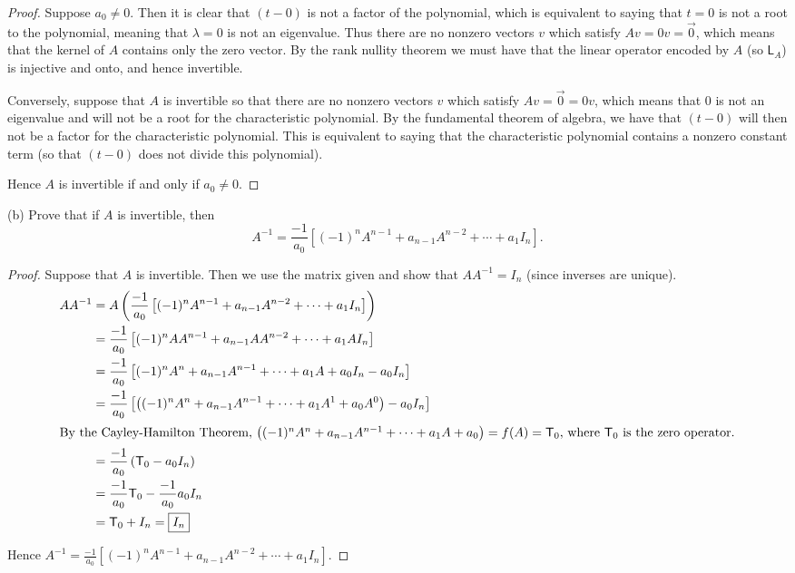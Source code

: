 \documentclass[11pt]{article}
\newcommand{\br}[1]{\left(#1\right)}
\newcommand{\sbr}[1]{\left[#1\right]}
\begin{document}
\begin{proof}
  Suppose $a_0\neq 0$. Then it is clear that $(t-0)$ is not a factor of the polynomial, which is equivalent to saying that $t=0$ is not a root to the polynomial, meaning that $\lambda=0$ is not an eigenvalue. Thus there are no nonzero vectors $v$ which satisfy $Av = 0v = \vec{0}$, which means that the kernel of $A$ contains only the zero vector. By the rank nullity theorem we must have that the linear operator encoded by $A$ (so $\mathsf{L}_A$) is injective and onto, and hence invertible.

  Conversely, suppose that $A$ is invertible so that there are no nonzero vectors $v$ which satisfy $Av = \vec{0} = 0v$, which means that $0$ is not an eigenvalue and will not be a root for the characteristic polynomial. By the fundamental theorem of algebra, we have that $(t-0)$ will then not be a factor for the characteristic polynomial. This is equivalent to saying that the characteristic polynomial contains a nonzero constant term (so that $(t-0)$ does not divide this polynomial).

  Hence $A$ is invertible if and only if $a_0\neq 0$.
\end{proof}

(b) Prove that if $A$ is invertible, then $$A^{-1} = \frac{-1}{a_0}\sbr{(-1)^nA^{n-1}+a_{n-1}A^{n-2}+\cdots +a_1I_n}.$$

\begin{proof}
  Suppose that $A$ is invertible. Then we use the matrix given and show that $AA^{-1} = I_n$ (since inverses are unique). 
  \begin{align*}
    AA^{-1} &= A\br{\frac{-1}{a_0}\sbr{(-1)^nA^{n-1}+a_{n-1}A^{n-2}+\cdots +a_1I_n}} \\
    &= \frac{-1}{a_0}\sbr{(-1)^nAA^{n-1}+a_{n-1}AA^{n-2}+\cdots +a_1AI_n} \\
    &= \frac{-1}{a_0}\sbr{(-1)^nA^{n}+a_{n-1}A^{n-1}+\cdots +a_1A + a_0I_n - a_0I_n} \\
    &= \frac{-1}{a_0}\sbr{\br{(-1)^nA^{n}+a_{n-1}A^{n-1}+\cdots +a_1A^1 + a_0A^0} - a_0I_n} \\
    \intertext{By the Cayley-Hamilton Theorem, $\br{(-1)^nA^{n}+a_{n-1}A^{n-1}+\cdots +a_1A + a_0} = f(A) = \mathsf{T}_0$, where $\mathsf{T}_0$ is the zero operator.}
    &= \frac{-1}{a_0}\br{\mathsf{T}_0 - a_0I_n} \\
    &= \frac{-1}{a_0}\mathsf{T}_0 - \frac{-1}{a_0}a_0I_n \\
    &= \mathsf{T}_0 + I_n = \boxed{I_n}
  \end{align*}

  Hence $A^{-1} = \frac{-1}{a_0}\sbr{(-1)^nA^{n-1}+a_{n-1}A^{n-2}+\cdots +a_1I_n}$.
\end{proof}
\end{document}
